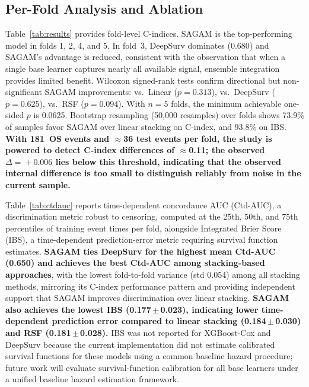 \documentclass[conference]{IEEEtran}
\begin{document}
\subsection{Per-Fold Analysis and Ablation}

Table~\ref{tab:results} provides fold-level C-indices.
SAGAM is the top-performing model in folds 1, 2, 4, and 5.
In fold~3, DeepSurv dominates (0.680) and SAGAM's advantage is reduced,
consistent with the observation that when a single base learner captures
nearly all available signal, ensemble integration provides limited benefit.
Wilcoxon signed-rank tests confirm directional but non-significant
SAGAM improvements: vs.\ Linear ($p\!=\!0.313$), vs.\ DeepSurv
($p\!=\!0.625$), vs.\ RSF ($p\!=\!0.094$).
With $n\!=\!5$ folds, the minimum achievable one-sided $p$ is 0.0625.
Bootstrap resampling (50,000 resamples) over folds shows 73.9\% of samples
favor SAGAM over linear stacking on C-index, and 93.8\% on IBS.
\textbf{With 181~OS events and $\approx$36 test events per fold, the study
is powered to detect C-index differences of $\approx$0.11; the observed
$\Delta\!=\!+0.006$ lies below this threshold, indicating that the observed
internal difference is too small to distinguish reliably from noise in the
current sample.}

Table~\ref{tab:ctdauc} reports time-dependent concordance AUC (Ctd-AUC),
a discrimination metric robust to censoring, computed at the 25th, 50th,
and 75th percentiles of training event times per fold, alongside Integrated
Brier Score (IBS), a time-dependent prediction-error metric requiring survival function estimates.
\textbf{SAGAM ties DeepSurv for the highest mean Ctd-AUC (0.650) and
achieves the best Ctd-AUC among stacking-based approaches}, with the lowest
fold-to-fold variance (std 0.054) among all stacking methods, mirroring
its C-index performance pattern and providing independent support that
SAGAM improves discrimination over linear stacking.
\textbf{SAGAM also achieves the lowest IBS (0.177\,$\pm$\,0.023), indicating
lower time-dependent prediction error compared to linear stacking
(0.184\,$\pm$\,0.030) and RSF (0.181\,$\pm$\,0.028).}
IBS was not reported for XGBoost-Cox and DeepSurv because the current
implementation did not estimate calibrated survival functions for these
models using a common baseline hazard procedure; future work will evaluate
survival-function calibration for all base learners under a unified
baseline hazard estimation framework.
\end{document}
